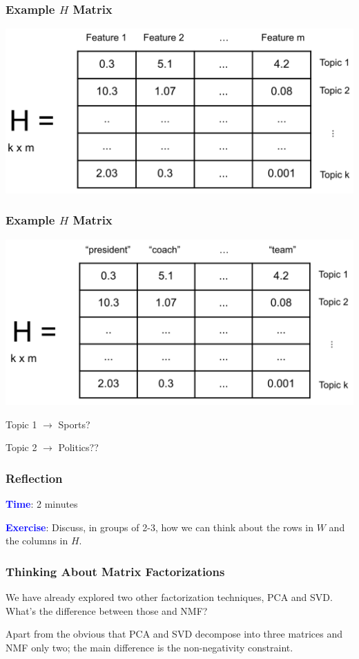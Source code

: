 \documentclass{beamer}
\begin{document}
\begin{frame}
  \frametitle{Example $H$ Matrix}
  \includegraphics[width=\textwidth]{images/h_matrix.png}
\end{frame}

\begin{frame}
  \frametitle{Example $H$ Matrix}
  \includegraphics[width=\textwidth]{images/h_topics.png} \vspace{2mm} \pause

  \centering
  Topic 1 $ \rightarrow $ Sports?

  Topic 2 $ \rightarrow $ Politics??
\end{frame}

\begin{frame}
  \frametitle{Reflection}
    \textbf{\textcolor{blue}{Time}}: 2 minutes \vspace{4mm}

    \textbf{\textcolor{blue}{Exercise}}: Discuss, in groups of 2-3, how we can think about the rows in $W$ and the columns in $H$.
\end{frame}

\begin{frame}
  \frametitle{Thinking About Matrix Factorizations}
  We have already explored two other factorization techniques, PCA and SVD. What's the difference between those and NMF? \vspace{4mm} \pause

  Apart from the obvious that PCA and SVD decompose into three matrices and NMF only two; the main difference is the non-negativity constraint.
\end{frame}
\end{document}
